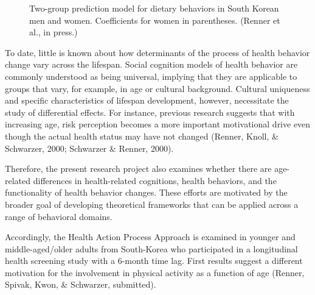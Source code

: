 \begin{figure}[h!tb]
  \begin{center}
    \caption{Two-group prediction model for dietary behaviors in South Korean men and women. Coefficients for women in parentheses. (Renner et al., in press.)}
    \label{fig2:profBrittaRenner}
  \end{center}
\end{figure}


\newpage
 To date, little is known about how determinants of the process of health behavior change vary across the lifespan. Social cognition models of health behavior are commonly understood as being universal, implying that they are applicable to groups that vary, for example, in age or cultural background. Cultural uniqueness and specific characteristics of lifespan development, however, necessitate the study of differential effects. For instance, previous research suggests that with increasing age, risk perception becomes a more important motivational drive even though the actual health status may have not changed (Renner, Knoll, \& Schwarzer, 2000; Schwarzer \& Renner, 2000).

 Therefore, the present research project also examines whether there are age-related differences in health-related cognitions, health behaviors, and the functionality of health behavior changes. These efforts are motivated by the broader goal of developing theoretical frameworks that can be applied across a range of behavioral domains.

 Accordingly, the Health Action Process Approach is examined in younger and middle-aged/older adults from South-Korea who participated in a longitudinal health screening study with a 6-month time lag. First results suggest a different motivation for the involvement in physical activity as a function of age (Renner, Spivak, Kwon, \& Schwarzer, submitted).

